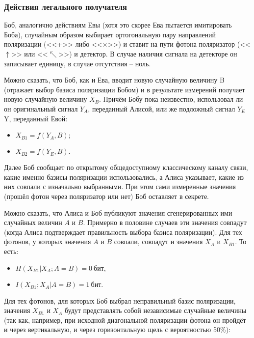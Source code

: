 \subsubsection{Действия легального получателя}

Боб, аналогично действиям Евы (хотя это скорее Ева пытается имитировать Боба), случайным образом выбирает ортогональную пару направлений поляризации (<<+>> либо <<×>>) и ставит на пути фотона поляризатор (<<$\uparrow$>> или <<$\nwarrow$>>) и детектор. В случае наличия сигнала на детекторе он записывает единицу, в случае отсутствия – ноль.

Можно сказать, что Боб, как и Ева, вводит новую случайную величину B (отражает выбор базиса поляризации Бобом) и в результате измерений получает новую случайную величину $X_B$. Причём Бобу пока неизвестно, использовал ли он оригинальный сигнал $Y_A$, переданный Алисой, или же подложный сигнал $Y_E$Y, переданный Евой:

\begin{itemize}
	\item $X_{B1} = f \left( Y_A, B \right);$
	\item $X_{B2} = f \left( Y_E, B \right).$
\end{itemize}

Далее Боб сообщает по открытому общедоступному классическому каналу связи, какие именно базисы поляризации использовались, а Алиса указывает, какие из них совпали с изначально выбранными. При этом сами измеренные значения (прошёл фотон через поляризатор или нет) Боб оставляет в секрете.

Можно сказать, что Алиса и Боб публикуют значения сгенерированных ими случайных величин $A$ и $B$. Примерно в половине случаев эти значения совпадут (когда Алиса подтверждает правильность выбора базиса поляризации). Для тех фотонов, у которых значения $A$ и $B$ совпали, совпадут и значения $X_A$ и $X_{B1}$. То есть:

\begin{itemize}
	\item $H \left( X_{B1} | X_A; A = B \right) = 0~\text{бит}$,
	\item $I \left( X_{B1} ; X_A | A = B \right) = 1~\text{бит}$.
\end{itemize}

Для тех фотонов, для которых Боб выбрал неправильный базис поляризации, значения $X_{B1}$ и $X_{A}$ будут представлять собой независимые случайные величины (так как, например, при исходной диагональной поляризации фотона он пройдёт и через вертикальную, и через горизонтальную щель с вероятностью 50\%):

